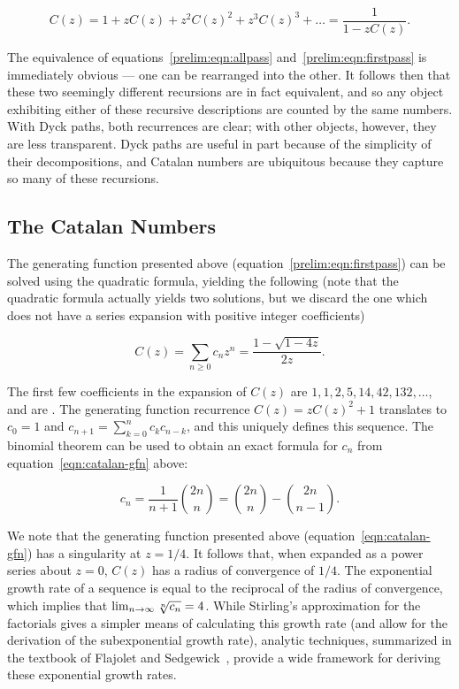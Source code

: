     \begin{equation} \label{prelim:eqn:allpass}
      C(z) = 1 + zC(z) + z^2 C(z)^2 + z^3 C(z)^3 + \dots = \frac{1}{1 - zC(z)}.
    \end{equation}

    The equivalence of equations~\ref{prelim:eqn:allpass}
    and~\ref{prelim:eqn:firstpass} is immediately obvious --- one can be
    rearranged into the other.
    It follows then that these two seemingly different recursions are in fact
    equivalent, and so any object exhibiting either of these recursive
    descriptions are counted by the same numbers. 
    With Dyck paths, both recurrences are clear;
    with other objects, however, they are less transparent. Dyck paths are
    useful in part because of the simplicity of their decompositions, and
    Catalan numbers are ubiquitous because they capture so many of these
    recursions. 

  \subsection{The Catalan Numbers}
  \label{prelim:sub:catalan}
    
    The generating function presented above
    (equation~\ref{prelim:eqn:firstpass}) can be solved using the quadratic
    formula, yielding the following (note that the quadratic formula actually
    yields two solutions, but we discard the one which does not have a series
    expansion with positive integer coefficients) 

    \begin{equation} \label{eqn:catalan-gfn}
      C(z) = \sum_{n \geq 0} c_n z^n = \frac{1 - \sqrt{1 - 4z}}{2z}.
    \end{equation}

    The first few coefficients in the expansion of $C(z)$ are
    $1,1,2, 5, 14, 42, 132, \dots$, and are .  The generating
    function recurrence $C(z) = zC(z)^2 + 1$ translates to $c_0 =1$ and
    $c_{n+1} = \sum_{k=0}^n c_{k} c_{n-k}$, and this uniquely defines this
    sequence.  The binomial theorem can be used to obtain an exact formula for
    $c_n$ from equation~\ref{eqn:catalan-gfn} above:

    \begin{equation} \label{eqn:catalan-exact}
      c_n = \frac{1}{n+1} \binom{2n}{n} = \binom{2n}{n} - \binom{2n}{n-1}.
    \end{equation}

    We note that the generating function presented above
    (equation~\ref{eqn:catalan-gfn}) has a singularity at $z=1/4$. It follows
    that, when expanded as a power series about $z=0$, $C(z)$ has a radius of
    convergence of $1/4$. The exponential growth rate of a sequence is equal to
    the reciprocal of the radius of convergence, which implies that $\lim_{n \rightarrow \infty}
    \sqrt[n]{c_n} = 4$. 
    While Stirling's approximation for the factorials gives a simpler means of
    calculating this growth rate (and allow for the derivation of the
    subexponential growth rate), analytic techniques, summarized in the
    textbook of Flajolet and Sedgewick~\cite{flajolet}, provide a wide
    framework for deriving these exponential growth rates.




